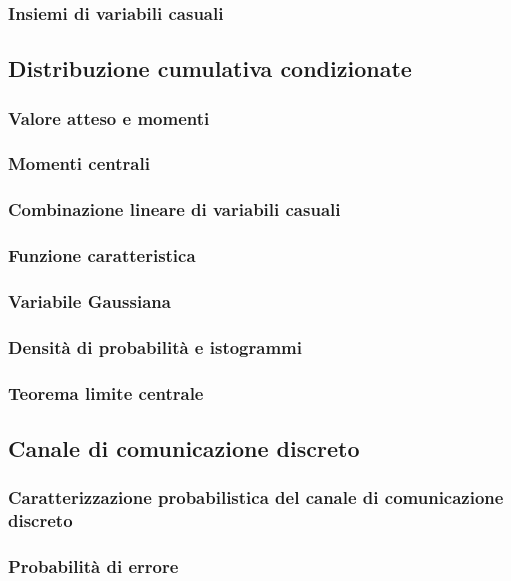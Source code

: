 \documentclass[../main.tex]{subfiles}
\begin{document}
\subsubsection{Insiemi di variabili casuali}

\subsection{Distribuzione cumulativa condizionate}

\subsubsection{Valore atteso e momenti}

\subsubsection{Momenti centrali}

\subsubsection{Combinazione lineare di variabili casuali}

\subsubsection{Funzione caratteristica}

\subsubsection{Variabile Gaussiana}
\subsubsection{Densità di probabilità e istogrammi}
\subsubsection{Teorema limite centrale}

\subsection{Canale di comunicazione discreto}
\subsubsection{Caratterizzazione probabilistica del canale di comunicazione discreto}
\subsubsection{Probabilità di errore}
\end{document}
